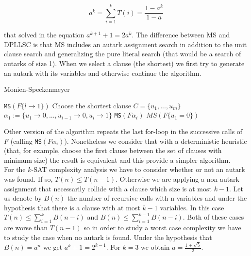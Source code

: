 $$a^k = \sum_{i=1}^kT(i) = \frac{1-a^k}{1-a}$$

that solved in the equation $a^{k+1}+1 = 2a^k$. The difference between MS and DPLLSC is that MS includes an autark assignment search in addition to the unit clause search and generalizing the pure literal search (that would be a search of autarks of size 1). When we select a clause (the shortest) we first try to generate an autark with its variables and otherwise continue the algorithm.


\begin{algorithm}
  \caption{Monien-Speckenmeyer}\label{MS}
  \begin{algorithmic}[1]
     
    \EndIf
     
    \EndIf
    \State
     \Return \texttt{MS}$(F\{l\to 1\})$
    \EndIf
     
  \EndIf
  \State Choose the shortest clause $C = \{u_1,...,u_m\}$
  \State $\alpha_1 := \{u_1\to 0,...,u_{i-1}\to 0,u_i\to 1\}$
   \Return \texttt{MS}$(F\alpha_i)$
  \EndIf
  \EndFor
   
  \EndIf
  \State \Return $MS(F\{u_1=0\})$
  \EndProcedure
\end{algorithmic}
\end{algorithm}


Other version of the algorithm repeats the last for-loop  in the successive calls of $F$ (calling \texttt{MS}$(F\alpha_i)$). Nonetheless we consider that with a deterministic heuristic (that, for example, choose the first clause between the set of clauses with minimum size) the result is equivalent and this provide a simpler algorithm.\\

For the $k$-SAT complexity analysis we have to consider whether or not an autark was found. If so, $T(n) \le T(n-1)$. Otherwise we are applying a non autark assignment that necessarily collide with a clause which size is at most $k-1$. Let us denote by $B(n)$ the number of recursive calls with n variables and under the hypothesis that there is a clause with at most $k-1$ variables. In this case $T(n) \le \sum_{i=1}^{k}B(n-i)$ and $B(n) \le \sum_{i=1}^{k-1}B(n-i)$. Both of these cases are worse than $T(n-1)$ so in order to study a worst case complexity we have to study the case when no autark is found. Under the hypothesis that $B(n) = a^n$ we get $a^k+1=2^{k-1}$. For $k=3$ we obtain $a=\frac{1 + \sqrt{5}}{2}$.



